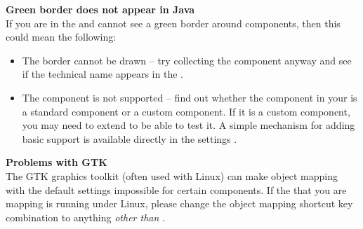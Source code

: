 % 
%
%


\textbf{Green border does not appear in Java \gdauts{}}\\
If you are in the \gdomm{}  and cannot see a green border around components, then this could mean the following:
\begin{itemize}
\item The border cannot be drawn -- try collecting the component anyway and see if the technical name appears in the \gdomeditor{}. 
\item The component is not supported -- find out whether the component in your \gdaut{} is a standard component or a custom component. If it is a custom component, you may need to extend \app{} to be able to test it. A simple mechanism for adding basic support is available directly in the \gdproject{} settings .
\end{itemize}


\textbf{Problems with GTK}\\
The GTK graphics toolkit (often used with Linux) can make object mapping with the default \app{} settings impossible for certain components. If the \gdaut{} that you are mapping is running under Linux, please change the object mapping shortcut key combination to anything \emph{other than} .
